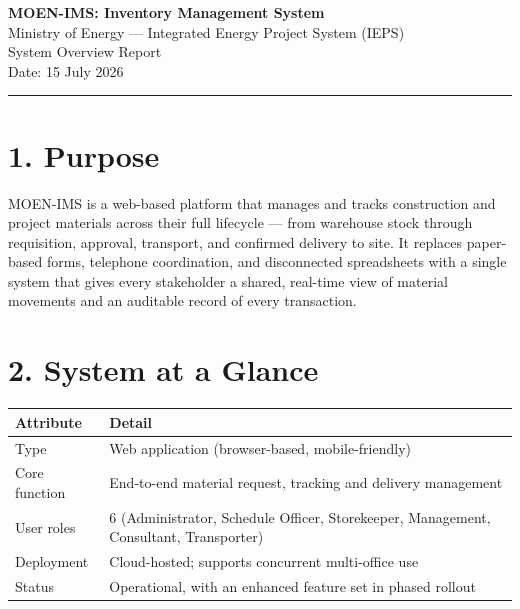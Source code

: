 \documentclass[11pt,a4paper]{article}
\begin{document}
\begin{center}
{\LARGE\bfseries\color{moenblue} MOEN-IMS: Inventory Management System}\\[4pt]
{\large Ministry of Energy — Integrated Energy Project System (IEPS)}\\[6pt]
{\normalsize System Overview Report}\\[2pt]
{\small Date: 15 July 2026}
\end{center}

\vspace{4pt}
\hrule
\vspace{8pt}

\section{1. Purpose}
MOEN-IMS is a web-based platform that manages and tracks construction and project
materials across their full lifecycle — from warehouse stock through requisition,
approval, transport, and confirmed delivery to site. It replaces paper-based forms,
telephone coordination, and disconnected spreadsheets with a single system that gives
every stakeholder a shared, real-time view of material movements and an auditable
record of every transaction.

\section{2. System at a Glance}
\begin{table}[h]
\centering
\small
\begin{tabular}{@{}ll@{}}
\toprule
\textbf{Attribute} & \textbf{Detail} \\
\midrule
Type & Web application (browser-based, mobile-friendly) \\
Core function & End-to-end material request, tracking and delivery management \\
User roles & 6 (Administrator, Schedule Officer, Storekeeper, Management, Consultant, Transporter) \\
Deployment & Cloud-hosted; supports concurrent multi-office use \\
Status & Operational, with an enhanced feature set in phased rollout \\
\bottomrule
\end{tabular}
\end{table}

\end{document}
